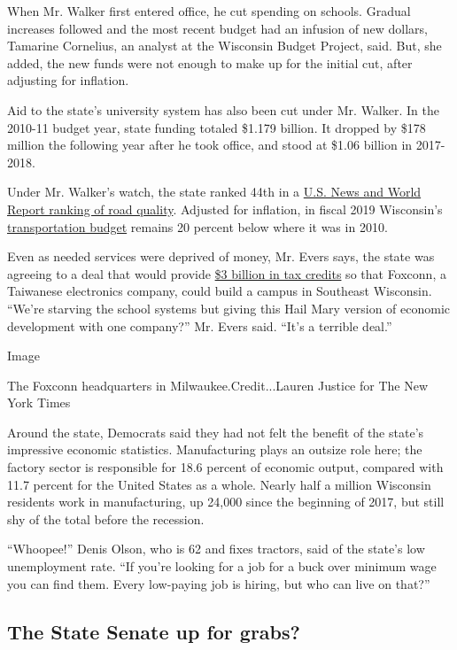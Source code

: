 When Mr. Walker first entered office, he cut spending on schools.
Gradual increases followed and the most recent budget had an infusion of
new dollars, Tamarine Cornelius, an analyst at the Wisconsin Budget
Project, said. But, she added, the new funds were not enough to make up
for the initial cut, after adjusting for inflation.

Aid to the state's university system has also been cut under Mr. Walker.
In the 2010-11 budget year, state funding totaled \$1.179 billion. It
dropped by \$178 million the following year after he took office, and
stood at \$1.06 billion in 2017-2018.

Under Mr. Walker's watch, the state ranked 44th in a
\href{https://www.usnews.com/news/best-states/wisconsin}{U.S. News and
World Report ranking of road quality}. Adjusted for inflation, in fiscal
2019 Wisconsin's
\href{https://wisconsindot.gov/Documents/about-wisdot/performance/budget/trends2018-2019.pdf}{transportation
budget} remains 20 percent below where it was in 2010.

Even as needed services were deprived of money, Mr. Evers says, the
state was agreeing to a deal that would provide
\href{https://www.nytimes.com/2017/07/27/business/wisconsin-foxconn-tax-subsidies.html}{\$3
billion in tax credits} so that Foxconn, a Taiwanese electronics
company, could build a campus in Southeast Wisconsin. ``We're starving
the school systems but giving this Hail Mary version of economic
development with one company?'' Mr. Evers said. ``It's a terrible
deal.''

Image

The Foxconn headquarters in Milwaukee.Credit...Lauren Justice for The
New York Times

Around the state, Democrats said they had not felt the benefit of the
state's impressive economic statistics. Manufacturing plays an outsize
role here; the factory sector is responsible for 18.6 percent of
economic output, compared with 11.7 percent for the United States as a
whole. Nearly half a million Wisconsin residents work in manufacturing,
up 24,000 since the beginning of 2017, but still shy of the total before
the recession.

``Whoopee!'' Denis Olson, who is 62 and fixes tractors, said of the
state's low unemployment rate. ``If you're looking for a job for a buck
over minimum wage you can find them. Every low-paying job is hiring, but
who can live on that?''

\hypertarget{the-state-senate-up-for-grabs}{%
\subsection{The State Senate up for
grabs?}\label{the-state-senate-up-for-grabs}}

